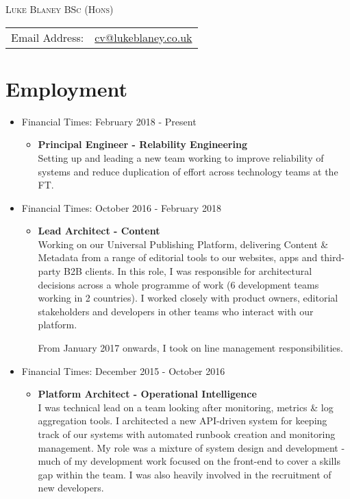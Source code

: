 \documentclass[a4paper]{article}
\begin{document}
\begin{center}\textsc{\LARGE Luke Blaney BSc (Hons)}\end{center}

\begin{tabular}{ l l }

Email Address: & \href{mailto:cv@lukeblaney.co.uk}{cv@lukeblaney.co.uk}\\

\end{tabular}

\section*{Employment}


\begin{itemize}

\item Financial Times: February 2018 - Present
\begin{itemize}\item
 {\bf Principal Engineer - Relability Engineering}\\
Setting up and leading a new team working to improve reliability of systems and reduce duplication of effort across technology teams at the FT.
\end{itemize}

\item Financial Times: October 2016 - February 2018
\begin{itemize}\item
 {\bf Lead Architect - Content}\\
Working on our Universal Publishing Platform, delivering Content \& Metadata from a range of editorial tools to our websites, apps and third-party B2B clients. In this role, I was responsible for architectural decisions across a whole programme of work (6 development teams working in 2 countries). I worked closely with product owners, editorial stakeholders and developers in other teams who interact with our platform.\par

From January 2017 onwards, I took on line management responsibilities.
\end{itemize}

\item Financial Times: December 2015 - October 2016
\begin{itemize}\item
 {\bf Platform Architect - Operational Intelligence}\\
I was technical lead on a team looking after monitoring, metrics \& log aggregation tools. I architected a new API-driven system for keeping track of our systems with automated runbook creation and monitoring management.  My role was a mixture of system design and development - much of my development work focused on the front-end to cover a skills gap within the team.  I was also heavily involved in the recruitment of new developers.
\end{itemize}


\end{itemize}
\end{document}
